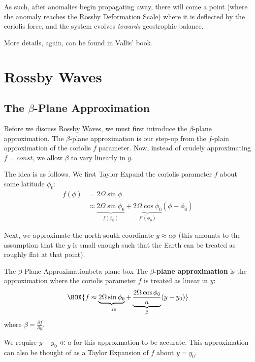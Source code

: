 As such, after anomalies begin propagating away, there will come a point (where the anomaly reaches the \hyperref[SW Def Radius Box]{Rossby Deformation Scale}) where it is deflected by the coriolis force, and the system evolves \textit{towards} geostrophic balance.

More details, again, can be found in Vallis' book.

\section{Rossby Waves}\label{s Rossby SW}

\subsection{The \texorpdfstring{\(\beta\)}{Beta}-Plane Approximation}

Before we discuss Rossby Waves, we must first introduce the \(\beta\)-plane approximation. The \(\beta\)-plane approximation is our step-up from the \(f\)-plain approximation of the coriolis \(f\) parameter. Now, instead of crudely approximating \(f=const\), we allow \(\beta\) to vary linearly in \(y\).

The idea is as follows. We first Taylor Expand the coriolis parameter \(f\) about some latitude \(\phi_0\):
\begin{align*}
    f(\phi)&=2\Omega \sin \phi\\
    &\approx \underbrace{2\Omega \sin \phi_0}_{f(\phi_0)}+\underbrace{2\Omega \cos \phi_0}_{f'(\phi_0)} (\phi-\phi_0)
\end{align*}

Next, we approximate the north-south coordinate \(y\approx a\phi\) (this amounts to the assumption that the \(y\) is small enough such that the Earth can be treated as roughly flat at that point).
\begin{fact}{The \(\beta\)-Plane Approximation}{beta plane box}\label{beta plane box}
    The \textbf{\(\beta\)-plane approximation} is the approximation where the coriolis parameter \(f\) is treated as linear in \(y\):
    \begin{align*}
        \BOX{f\approx \underbrace{2\Omega\sin\phi_0}_{\equiv f_0}+\underbrace{\frac{2\Omega\cos\phi_0}{a}}_{\beta} (y-y_0)}
    \end{align*}
    where \(\beta=\frac{\partial f}{\partial y}\).

    We require \(y-y_0\ll a\) for this approxmation to be accurate. This approximation can also be thought of as a Taylor Expansion of \(f\) about \(y=y_0\).
\end{fact}

